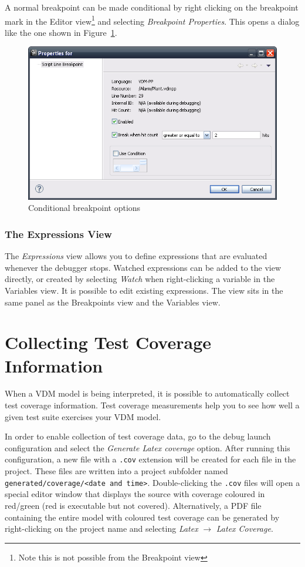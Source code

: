 \documentclass{overturerepchap}
\begin{document}
A normal breakpoint can be made conditional by right clicking on the breakpoint
mark in the Editor view\footnote{Note this is not possible from the Breakpoint view}
and selecting \emph{Breakpoint Properties}. This opens a dialog like the one shown in
Figure~\ref{fig:userguide:BreakpointConditional}.

\begin{figure}[htp]
\begin{center}
  \includegraphics[width=.6\textwidth]{figures/Breakpointconditional}
  \caption{Conditional breakpoint options}
  \label{fig:userguide:BreakpointConditional}
\end{center}
\end{figure}

\subsection{The Expressions View}

The \emph{Expressions} view allows you to define expressions that are evaluated
whenever the debugger stops.
Watched expressions can be added to the view directly, or created by selecting \emph{Watch}
when right-clicking a variable in the Variables view. It is possible to edit existing
expressions. The view sits in the same panel as the Breakpoints view and
the Variables view.

\chapter{Collecting Test Coverage Information}\label{sec:testcoverage}

When a VDM model is being interpreted, it is possible to automatically collect
test coverage information. Test coverage measurements help you to see how well a
given test suite exercises your VDM model.

In order to enable collection of test coverage data, go to the debug launch 
configuration and select the \emph{Generate Latex coverage} option. After
running this configuration, a new file with a \texttt{.cov} extension will be created for 
each file in the project. These files are written into a project subfolder named
\texttt{generated/coverage/<date and time>}. Double-clicking the \texttt{.cov} files
will open a special editor window that displays the source with coverage
coloured in red/green (red is executable but not covered). Alternatively, a PDF file
containing the entire model with coloured test coverage can be generated 
by right-clicking on the project name and selecting \emph{Latex} $\rightarrow$ 
\emph{Latex Coverage}.
\end{document}
